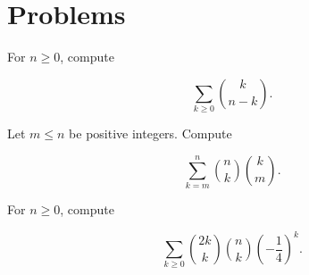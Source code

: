 \documentclass{article}
\begin{document}
\section{Problems}

\begin{exer}
For $n \ge 0$, compute

\[\sum_{k \ge 0}\binom{k}{n-k}.\]
\end{exer}

\begin{exer}
Let $m \le n$ be positive integers. Compute

\[\sum_{k=m}^n \binom{n}{k}\binom{k}{m}.\]
\end{exer}

\begin{exer}
For $n \ge 0$, compute

\[\sum_{k \ge 0} \binom{2k}{k}\binom{n}{k}\left(-\frac14\right)^k.\]
\end{exer}
\end{document}
